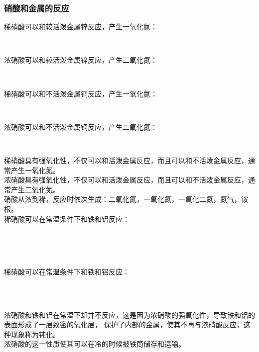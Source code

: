 \documentclass[UTF8]{ctexart}
\begin{document}
\subsubsection{硝酸和金属的反应}
    稀硝酸可以和较活泼金属锌反应，产生一氧化氮：
    \begin{center}
        \\[6mm]
    \end{center}
    浓硝酸可以和较活泼金属锌反应，产生二氧化氮：
    \begin{center}
        \\[6mm]
    \end{center}
    稀硝酸可以和不活泼金属铜反应，产生一氧化氮：
    \begin{center}
        \\[6mm]
    \end{center}
    浓硝酸可以和不活泼金属铜反应，产生二氧化氮：
    \begin{center}
        \\[6mm]
    \end{center}
    稀硝酸具有强氧化性，不仅可以和活泼金属反应，而且可以和不活泼金属反应，通常产生一氧化氮。\\[3mm]
    浓硝酸具有强氧化性，不仅可以和活泼金属反应，而且可以和不活泼金属反应，通常产生二氧化氮。\\[3mm]
    硝酸从浓到稀，反应时依次生成：二氧化氮，一氧化氮，一氧化二氮，氮气，铵根。\\[10mm]
    稀硝酸可以在常温条件下和铁和铝反应：
    \begin{center}
        \\[3mm]
        \\[3mm]
        \\[6mm]
    \end{center}
    稀硝酸可以在常温条件下和铁和铝反应：
    \begin{center}
        \\[3mm]
        \\[6mm]
    \end{center}
    浓硝酸和铁和铝在常温下却并不反应，这是因为浓硝酸的强氧化性，导致铁和铝的表面形成了一层致密的氧化层，
    保护了内部的金属，使其不再与浓硝酸反应，这种现象称为钝化。\\[3mm]
    浓硝酸的这一性质使其可以在冷的时候被铁筒储存和运输。
\end{document}
